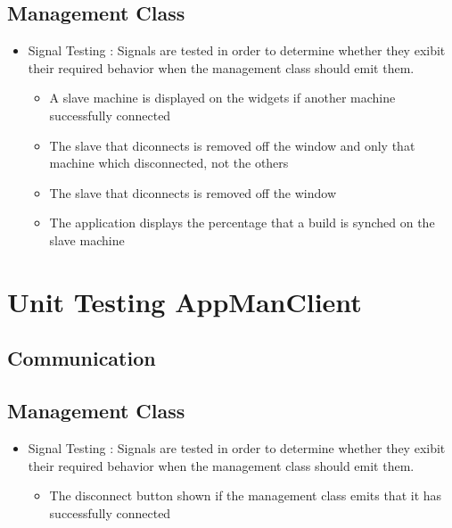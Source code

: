 \documentclass[a4paper,12pt,final]{article}
\begin{document}
\subsection{Management Class}
\begin{itemize}
\item Signal Testing : Signals are tested in order to determine whether they exibit their required behavior when the management class should emit them.
\begin{itemize}
\item A slave machine is displayed on the widgets if another machine successfully connected
\item The slave that diconnects is removed off the window and only that machine which disconnected, not the others
\item The slave that diconnects is removed off the window
\item The application displays the percentage that a build is synched on the slave machine
\end{itemize}
\end{itemize}





\section{Unit Testing AppManClient}
\subsection{Communication}

\subsection{Management Class}
\begin{itemize}
\item Signal Testing : Signals are tested in order to determine whether they exibit their required behavior when the management class should emit them.
\begin{itemize}
\item The disconnect button shown if the management class emits that it has successfully connected
\end{itemize}
\end{itemize}
\end{document}
